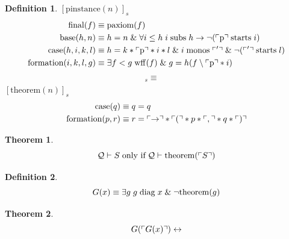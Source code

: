 \documentclass{amsbook}
\newcommand{\infers}{\mathrel\vdash}
\newcommand{\univ}[1]{\mathord\forall#1\;}
\newcommand{\exis}[1]{\mathord\exists#1\;}
\newcommand{\then}{\mathrel\rightarrow}
\newcommand{\conj}{\mathrel\&}
\newcommand{\eqv}{\mathrel\leftrightarrow}
\theoremstyle{definition}
\newtheorem{thm}{Theorem}[section]
\newtheorem{dfn}{Definition}[section]
\begin{document}
\begin{dfn}
    $[\mathrm{pinstance}(n)]_s$
    \begin{align*}
        \mathrm{final}(f) \equiv\;              & \mathrm{paxiom}(f)                                                              \\
        \mathrm{base}(h, n) \equiv\;            & h = n \conj \univ{i \leq h} i \subs h \then \neg(\ord{\mathrm p} \fuck i)       \\
        \mathrm{case}(h, i, k, l) \equiv\;      & h = k * \ord {\mathrm p} * i * l \conj i \monos \ord' \conj \neg(\ord' \fuck l) \\
        \mathrm{formation}(i, k, l, g) \equiv\; & \exis{f < g} \mathrm{wff}(f) \conj g = h(f \setminus \ord {\mathrm p} * i)
    \end{align*}
    \begin{align*}
        [\mathrm{axiom}(n)]_s \equiv\; &
    \end{align*}
    $[\mathrm{theorem}(n)]_s$
    \begin{align*}
        \mathrm{case}(q)                            \equiv\; & q = q                                                 \\
        \mathrm{formation}(p, r) \equiv\;                    & r = \ulcorner\rightarrow\urcorner * \ulcorner(\urcorner * p * \ulcorner,\urcorner * q * \ulcorner)\urcorner
    \end{align*}
\end{dfn}

\begin{thm}
    \begin{equation*}
        \mathcal Q \infers S \text{\;only if\;} \mathcal Q \infers \mathrm{theorem}(\ord{S})
    \end{equation*}
\end{thm}

\begin{dfn}
    $$
        G(x) \equiv \exis g  g \diag x \conj \neg \mathrm{theorem}(g)
    $$
\end{dfn}

\begin{thm}
    $$G(\ord{G(x)}) \eqv $$
\end{thm}
\end{document}
